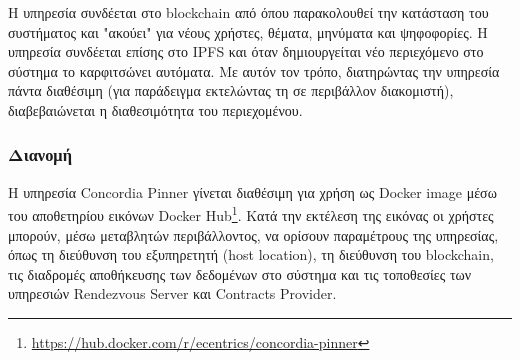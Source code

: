 Η υπηρεσία συνδέεται στο blockchain από όπου παρακολουθεί την κατάσταση του συστήματος και "ακούει" για νέους χρήστες, θέματα, μηνύματα και ψηφοφορίες. Η υπηρεσία συνδέεται επίσης στο IPFS και όταν δημιουργείται νέο περιεχόμενο στο σύστημα το καρφιτσώνει αυτόματα. Με αυτόν τον τρόπο, διατηρώντας την υπηρεσία πάντα διαθέσιμη (για παράδειγμα εκτελώντας τη σε περιβάλλον διακομιστή), διαβεβαιώνεται η διαθεσιμότητα του περιεχομένου.

\subsubsection{Διανομή}

Η υπηρεσία Concordia Pinner γίνεται διαθέσιμη για χρήση ως Docker image μέσω του αποθετηρίου εικόνων Docker Hub\footnote{\url{https://hub.docker.com/r/ecentrics/concordia-pinner}}. Κατά την εκτέλεση της εικόνας οι χρήστες μπορούν, μέσω μεταβλητών περιβάλλοντος, να ορίσουν παραμέτρους της υπηρεσίας, όπως τη διεύθυνση του εξυπηρετητή (host location), τη διεύθυνση του blockchain, τις διαδρομές αποθήκευσης των δεδομένων στο σύστημα και τις τοποθεσίες των υπηρεσιών Rendezvous Server και Contracts Provider.